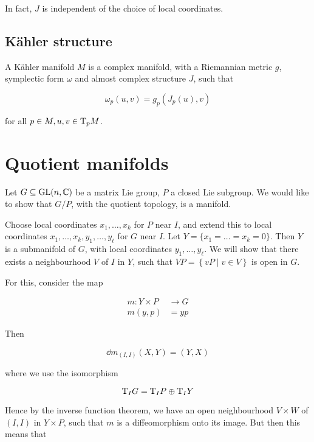 \documentclass{article}
\begin{document}
In fact, \(J\) is independent of the choice of local coordinates.

\subsection{K\"ahler structure}

\begin{definition}
     A K\"ahler manifold \(M\) is a complex manifold, with a Riemannian metric \(g\), symplectic form \(\omega\) and almost complex structure \(J\), such that

    \[\omega_p(u, v) = g_p(J_p(u), v)\]

    for all \(p \in M, u, v \in \mathrm{T}_pM\).
\end{definition}

\section{Quotient manifolds}

\label{sec:quotient}

Let \(G \subseteq \operatorname{GL}(n, \mathbb{C})\) be a matrix Lie group, \(P\) a closed Lie subgroup. We would like to show that \(G/P\), with the quotient topology, is a manifold.

Choose local coordinates \(x_1, \dots, x_k\) for \(P\) near \(I\), and extend this to local coordinates \(x_1, \dots, x_k, y_1, \dots, y_\ell\) for \(G\) near \(I\). Let \(Y = \{x_1 = \dots = x_k = 0\}\). Then \(Y\) is a submanifold of \(G\), with local coordinates \(y_1, \dots, y_\ell\). We will show that there exists a neighbourhood \(V\) of \(I\) in \(Y\), such that \(VP = \left\{vP \mid v \in V\right\}\) is open in \(G\).

For this, consider the map

\begin{align*}
    m :Y \times P &\to G \\
    m(y, p) &= yp
\end{align*}

Then

\[\dd m_{(I, I)}(X, Y) = (Y, X)\]

where we use the isomorphism

\[\mathrm{T}_I G = \mathrm{T}_I P \oplus \mathrm{T}_I Y\]

Hence by the inverse function theorem, we have an open neighbourhood \(V \times W\) of \((I, I)\) in \(Y \times P\), such that \(m\) is a diffeomorphism onto its image. But then this means that
\end{document}
